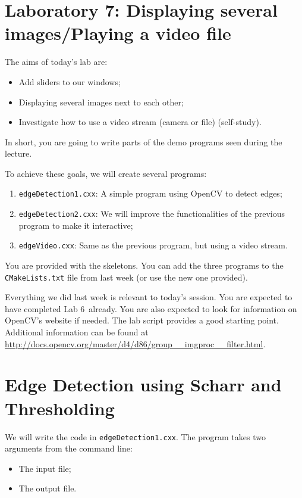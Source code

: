 \documentclass[english,a4paper,12pt,oneside]{article}
\begin{document}
\sloppy 

\section*{Laboratory 7: Displaying several images/Playing a video file}


The aims of today's lab are:
\begin{itemize}
	\item Add sliders to our windows;
	\item Displaying several images next to each other;
	\item Investigate how to use a video stream (camera or file) (self-study).
\end{itemize}
In short, you are going to write parts of the demo programs seen during the lecture.

To achieve these goals, we will create several programs:
\begin{enumerate}
	\item \verb+edgeDetection1.cxx+: A simple program using OpenCV to detect edges;
	\item \verb+edgeDetection2.cxx+: We will improve the functionalities of the previous program to make it interactive;
	\item \verb+edgeVideo.cxx+: Same as the previous program, but using a video stream.
\end{enumerate}
You are provided with the skeletons. 
You can add the three programs to the \verb+CMakeLists.txt+ file from last week (or use the new one provided).

Everything we did last week is relevant to today's session. 
You are expected to have completed Lab 6~already. 
You are also expected to look for information on OpenCV's website if needed. 
The lab script provides a good starting point. 
Additional information can be found at \url{http://docs.opencv.org/master/d4/d86/group__imgproc__filter.html}.


\section{Edge Detection using Scharr and Thresholding}

We will write the code in \verb+edgeDetection1.cxx+.
The program takes two arguments from the command line:
\begin{itemize}
 \item The input file;
 \item The output file.
\end{itemize}
\end{document}
